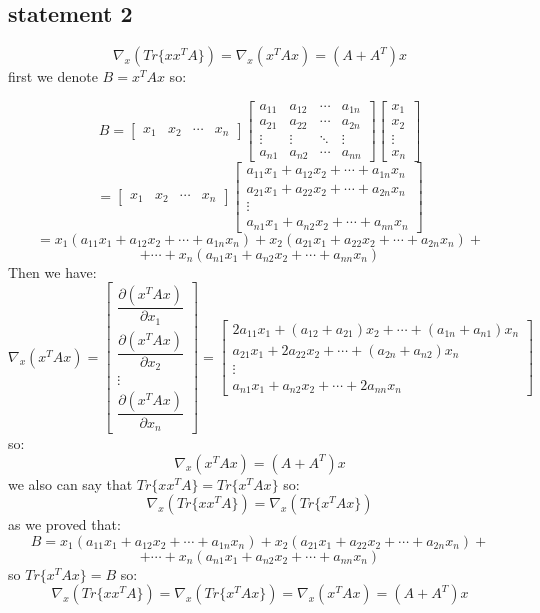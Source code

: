 \subsection{statement 2}
$$\nabla_x (Tr\{xx^T A\}) = \nabla_x (x^TAx) = (A+A^T)x$$
first we denote $B = x^T A x$ so:
\begin{qsolve}
	\begin{qsolve}[]
		$$B = \begin{bmatrix} x_1 & x_2 & \cdots & x_n \end{bmatrix} \begin{bmatrix} a_{11} & a_{12} & \cdots & a_{1n} \\ a_{21} & a_{22} & \cdots & a_{2n} \\ \vdots & \vdots & \ddots & \vdots \\ a_{n1} & a_{n2} & \cdots & a_{nn} \end{bmatrix} \begin{bmatrix} x_1 \\ x_2 \\ \vdots \\ x_n \end{bmatrix} $$
		$$ = \begin{bmatrix} x_1 & x_2 & \cdots & x_n \end{bmatrix} \begin{bmatrix} a_{11}x_1 + a_{12}x_2 + \cdots + a_{1n}x_n \\ a_{21}x_1 + a_{22}x_2 + \cdots + a_{2n}x_n \\ \vdots \\ a_{n1}x_1 + a_{n2}x_2 + \cdots + a_{nn}x_n \end{bmatrix} $$
		$$ = x_1(a_{11}x_1 + a_{12}x_2 + \cdots + a_{1n}x_n) + x_2(a_{21}x_1 + a_{22}x_2 + \cdots + a_{2n}x_n) +$$
		$$ + \cdots + x_n(a_{n1}x_1 + a_{n2}x_2 + \cdots + a_{nn}x_n)$$
		Then we have:
		$$\nabla_x (x^TAx) = \begin{bmatrix} \dfrac{\partial (x^TAx)}{\partial x_1} \\ \dfrac{\partial (x^TAx)}{\partial x_2} \\ \vdots \\ \dfrac{\partial (x^TAx)}{\partial x_n} \end{bmatrix} = \begin{bmatrix} 2a_{11}x_1 + (a_{12}+a_{21})x_2 + \cdots + (a_{1n}+a_{n1})x_n \\ a_{21}x_1 + 2a_{22}x_2 + \cdots + (a_{2n}+a_{n2})x_n \\ \vdots \\ a_{n1}x_1 + a_{n2}x_2 + \cdots + 2a_{nn}x_n \end{bmatrix}$$
		so:
		$$\nabla_x (x^TAx) = (A+A^T)x$$
		we also can say that $Tr\{ xx^T A \} = Tr\{x^T A x\}$ so:
		$$\nabla_x (Tr\{xx^T A\}) = \nabla_x(Tr\{ x^T A x\})$$
		as we proved that:
		$$ B = x_1(a_{11}x_1 + a_{12}x_2 + \cdots + a_{1n}x_n) + x_2(a_{21}x_1 + a_{22}x_2 + \cdots + a_{2n}x_n) +$$
		$$ + \cdots + x_n(a_{n1}x_1 + a_{n2}x_2 + \cdots + a_{nn}x_n)$$		so $Tr\{x^T A x\} = B$ so:
		$$\nabla_x (Tr\{xx^T A\}) = \nabla_x(Tr\{ x^T A x\}) = \nabla_x (x^TAx) = (A+A^T)x$$
	\end{qsolve}
\end{qsolve}
